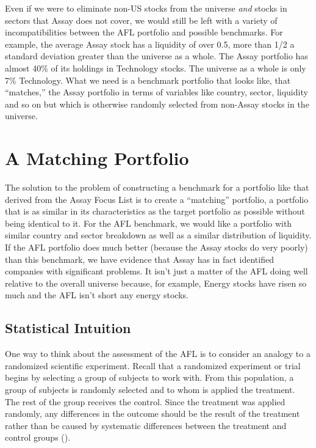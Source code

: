 \documentclass{article}
\begin{document}
Even if we were to eliminate non-US stocks from the universe
\emph{and} stocks in sectors that Assay does not cover, we would still
be left with a variety of incompatibilities between the AFL portfolio
and possible benchmarks. For example, the average Assay stock has a
liquidity of over 0.5, more than 1/2 a standard deviation greater than
the universe as a whole. The Assay portfolio has almost 40\% of its
holdings in Technology stocks. The universe as a whole is only 7\%
Technology. What we need is a benchmark portfolio that looks like,
that ``matches,'' the Assay portfolio in terms of variables like
country, sector, liquidity and so on but which is otherwise randomly
selected from non-Assay stocks in the universe.

\section{A Matching Portfolio}

The solution to the problem of constructing a benchmark for a portfolio
like that derived from the Assay Focus List is to create a
``matching'' portfolio, a portfolio that is as similar in its
characteristics as the target portfolio as possible without being
identical to it. For the AFL benchmark, we would like a portfolio with
similar country and sector breakdown as well as a similar distribution
of liquidity. If the AFL portfolio does much better (because the Assay
stocks do very poorly) than this benchmark, we have evidence that
Assay has in fact identified companies with significant problems. It
isn't just a matter of the AFL doing well relative to the overall
universe because, for example, Energy stocks have risen so much and
the AFL isn't short any energy stocks.


\subsection{Statistical Intuition}

One way to think about the assessment of the AFL is to consider an
analogy to a randomized scientific experiment. Recall that a
randomized experiment or trial begins by selecting a group of subjects
to work with. From this population, a group of subjects is randomly
selected and to whom is applied the treatment. The rest of the group
receives the control. Since the treatment was applied randomly, any
differences in the outcome should be the result of the treatment
rather than be caused by systematic differences between the treatment
and control groups (\cite{rubin}).
\end{document}
